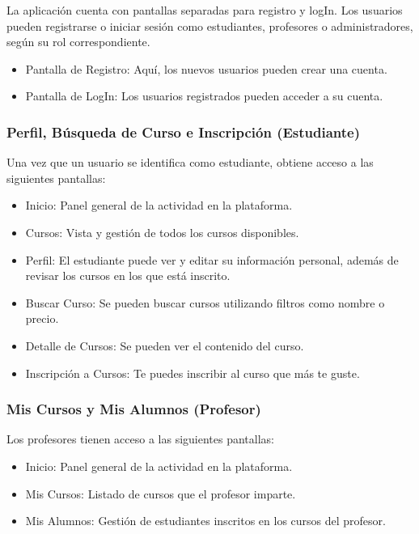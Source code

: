 \documentclass[
]{article}
\providecommand{\tightlist}{%
  \setlength{\itemsep}{0pt}\setlength{\parskip}{0pt}}
\begin{document}
La aplicación cuenta con pantallas separadas para registro y logIn. Los
usuarios pueden registrarse o iniciar sesión como estudiantes,
profesores o administradores, según su rol correspondiente.

\begin{itemize}
\tightlist
\item
  Pantalla de Registro: Aquí, los nuevos usuarios pueden crear una
  cuenta.
\item
  Pantalla de LogIn: Los usuarios registrados pueden acceder a su
  cuenta.
\end{itemize}

\subsubsection{Perfil, Búsqueda de Curso e Inscripción
(Estudiante)}\label{perfil-buxfasqueda-de-curso-e-inscripciuxf3n-estudiante}

Una vez que un usuario se identifica como estudiante, obtiene acceso a
las siguientes pantallas:

\begin{itemize}
\tightlist
\item
  Inicio: Panel general de la actividad en la plataforma.
\item
  Cursos: Vista y gestión de todos los cursos disponibles.
\item
  Perfil: El estudiante puede ver y editar su información personal,
  además de revisar los cursos en los que está inscrito.
\item
  Buscar Curso: Se pueden buscar cursos utilizando filtros como nombre o
  precio.
\item
  Detalle de Cursos: Se pueden ver el contenido del curso.
\item
  Inscripción a Cursos: Te puedes inscribir al curso que más te guste.
\end{itemize}

\subsubsection{Mis Cursos y Mis Alumnos
(Profesor)}\label{mis-cursos-y-mis-alumnos-profesor}

Los profesores tienen acceso a las siguientes pantallas:

\begin{itemize}
\tightlist
\item
  Inicio: Panel general de la actividad en la plataforma.
\item
  Mis Cursos: Listado de cursos que el profesor imparte.
\item
  Mis Alumnos: Gestión de estudiantes inscritos en los cursos del
  profesor.
\end{itemize}
\end{document}

